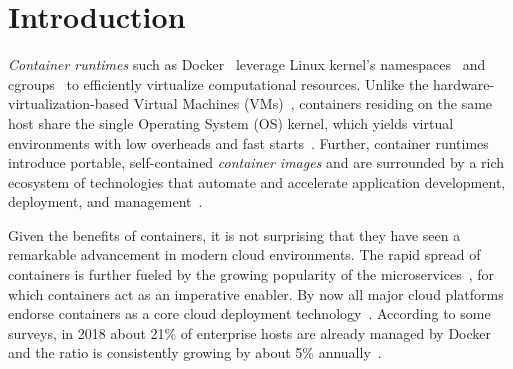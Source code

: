 \section{Introduction}
\label{sec:intro}

%
%
%
%
%
%
%



\emph{Container runtimes} such as Docker~\cite{docker} 
leverage Linux kernel's namespaces~\cite{namespaces} and cgroups~\cite{cgroups}
to efficiently virtualize computational resources.
%
Unlike the hardware-virtualization-based Virtual Machines
(VMs)~\cite{adams2006comparison}, containers residing on the same host share
the single Operating System (OS) kernel, which yields virtual environments with
low overheads and fast starts~\cite{7819678}.
%
Further, container runtimes introduce portable, self-contained \emph{container
images} and are surrounded by a rich ecosystem of technologies that automate
and accelerate application development, deployment, and
management~\cite{cncfprojects}.

Given the benefits of containers, it is not surprising that they have seen a
remarkable advancement in modern cloud environments.
%
The rapid spread of containers is further fueled by the growing popularity of
the microservices~\cite{wolff2016microservices},
for which containers act as an imperative enabler.
%
By now all major cloud platforms endorse containers as a core cloud deployment
technology~\cite{googlecengine,azurec,ibmkube,awscont}.
%
According to some surveys, in 2018 about 21\% of enterprise hosts are already
managed by Docker and the ratio is consistently growing by about 5\%
annually~\cite{20percentdocker}.


